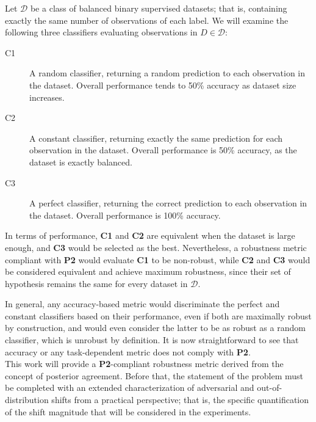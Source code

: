 \begin{example}
    Let $\mathcal{D}$ be a class of balanced binary supervised datasets; that is,
    containing exactly the same number of observations of each 
    label. We will examine the following 
    three classifiers evaluating observations in $D \in \mathcal{D}$:

    \begin{description}
        \item[C1] A random classifier, returning
        a random prediction to each observation in the dataset. Overall performance 
        tends to 50\% accuracy as dataset size increases. 
        \item[C2] A constant classifier, returning exactly the same
        prediction for each observation in the dataset. Overall performance is 50\% accuracy,
        as the dataset is exactly balanced.
        \item[C3] A perfect classifier, returning the correct prediction
        to each observation in the dataset. Overall performance is 100\% accuracy. 
    \end{description}

    In terms of performance, \textbf{C1} and \textbf{C2} are equivalent when
    the dataset is large enough, and \textbf{C3} would be selected as the best.
    Nevertheless, a robustness metric compliant with \textbf{P2} would
    evaluate \textbf{C1} to be non-robust, while \textbf{C2} and
    \textbf{C3} would be considered equivalent and achieve maximum robustness, since their
    set of hypothesis remains the same for every dataset in $\mathcal{D}$.
\end{example}

In general, any accuracy-based metric would discriminate the perfect and
constant classifiers based on their performance, even if both are maximally robust
by construction, and would even consider the latter to be as robust as 
a random classifier, which is unrobust by definition. It is now straightforward to see 
that accuracy or any task-dependent metric does not comply with \textbf{P2}. \\

This work will provide a \textbf{P2}-compliant robustness metric derived from the
concept of posterior agreement. Before that, the statement of the problem must be 
completed with an extended characterization of adversarial and out-of-distribution 
shifts from a practical perspective; that is, the specific quantification
of the shift magnitude that will be considered in the experiments.

